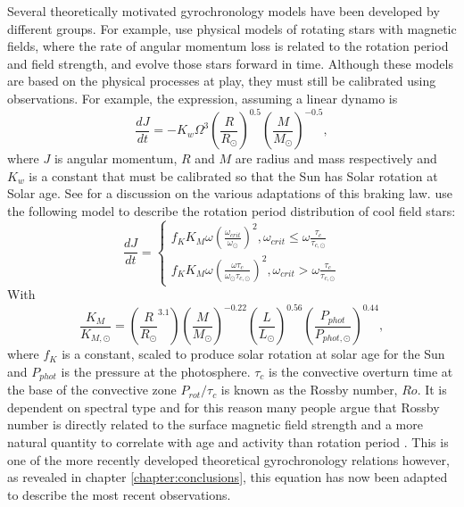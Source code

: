 Several theoretically motivated gyrochronology models have been developed by
different groups.
For example, \citet{Kawaler1988, Collier-cameron1994, Reiners2012,
Epstein2014, Vansaders2014} use physical models of rotating stars with
magnetic fields, where the rate of angular momentum loss is related to the
rotation period and field strength, and evolve those stars forward in time.
Although these models are based on the physical processes at play, they must
still be calibrated using observations.
For example, the \citet{Kawaler1988} expression, assuming a linear dynamo is
\begin{equation}
\frac{dJ}{dt} = -K_w\Omega^3\left(\frac{R}{R_\odot}\right)^{0.5}
\left(\frac{M}{M_\odot}\right)^{-0.5},
\end{equation}
where $J$ is angular momentum, $R$ and $M$ are radius and mass respectively
and $K_w$ is a constant that must be calibrated so that the Sun has Solar
rotation at Solar age.
See \citet{Barnes2010b} for a discussion on the various adaptations of this
braking law.
\citet{Vansaders2014} use the following model to describe the rotation period
distribution of cool field stars:
\begin{equation}
\frac{dJ}{dt} = \left\{
                \begin{array}{ll}
                  f_K K_M \omega \left( \frac{\omega_{crit}}{\omega_\odot}
                  \right)^2, \omega_{crit} \leq \omega
                  \frac{\tau_{c}}{\tau_{c, \odot}} \\
                  f_K K_M \omega \left( \frac{\omega\tau_{c}}
                  {\omega_\odot\tau_{c, \odot}}
                  \right)^2, \omega_{crit} > \omega
                  \frac{\tau_{c}}{\tau_{c, \odot}}
                \end{array}
              \right.
\end{equation}
\label{eq:vansaders}
With
\begin{equation}
    \frac{K_M}{K_{M, \odot}} = \left(\frac{R}{R_\odot}^{3.1}\right)
    \left(\frac{M}{M_\odot}\right)^{-0.22}
    \left(\frac{L}{L_\odot}\right)^{0.56}
    \left(\frac{P_{phot}}{P_{phot, \odot}}\right)^{0.44},
\end{equation}
\label{eq:vansaders2}
where $f_K$ is a constant, scaled to produce solar rotation at solar age for
the Sun and $P_{phot}$ is the pressure at the photosphere.
$\tau_c$ is the convective overturn time at the base of the convective zone
$P_{rot}/\tau_c$ is known as the Rossby number, $Ro$.
It is dependent on spectral type and for this reason many people argue that
Rossby number is directly related to the surface magnetic field strength and a
more natural quantity to correlate with age and activity than rotation period
\citep[\eg][]{Vansaders2015} \citep[although this view is not universally
held, see][]{Reiners2014}.
This is one of the more recently developed theoretical gyrochronology
relations however, as revealed in chapter \ref{chapter:conclusions}, this
equation has now been adapted to describe the most recent observations.

